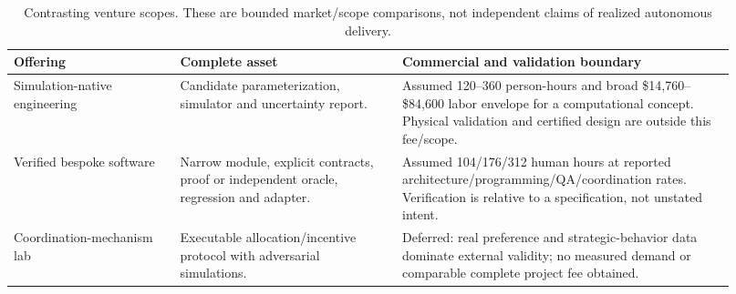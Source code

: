 \begin{table}[!htbp]\centering\small
\caption{Contrasting venture scopes. These are bounded market/scope comparisons, not independent claims of realized autonomous delivery.}
\begin{tabularx}{\linewidth}{>{\raggedright\arraybackslash}p{0.21\linewidth}>{\raggedright\arraybackslash}p{0.29\linewidth}>{\raggedright\arraybackslash}p{0.42\linewidth}}\toprule
Offering & Complete asset & Commercial and validation boundary\\\midrule
Simulation-native engineering & Candidate parameterization, simulator and uncertainty report. & Assumed 120--360 person-hours and broad \$14,760--\$84,600 labor envelope for a computational concept. Physical validation and certified design are outside this fee/scope.\\
Verified bespoke software & Narrow module, explicit contracts, proof or independent oracle, regression and adapter. & Assumed 104/176/312 human hours at reported architecture/programming/QA/coordination rates. Verification is relative to a specification, not unstated intent.\\
Coordination-mechanism lab & Executable allocation/incentive protocol with adversarial simulations. & Deferred: real preference and strategic-behavior data dominate external validity; no measured demand or comparable complete project fee obtained.\\
\bottomrule
\end{tabularx}
\end{table}
